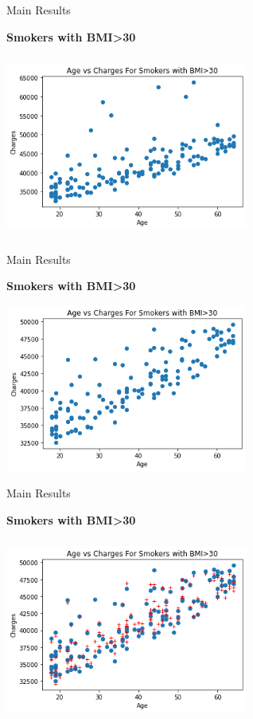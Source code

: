\documentclass[handout,9pt]{beamer}
\numberwithin{theorem}{section}
\begin{document}
\begin{frame}{Main Results}
	\begin{spacing}{1}
		\textbf{Smokers with BMI>30}
		\begin{center}
			\includegraphics[height=6cm, width=8cm]{work7}
		\end{center}
	\end{spacing}
\end{frame}

\begin{frame}{Main Results}
	\begin{spacing}{1}
		\textbf{Smokers with BMI>30}
		\begin{center}
			\includegraphics[height=5.5cm, width=8cm]{work8}
		\end{center}
	\hspace{3.5cm}{Correlation between Age and Charges = 0.8623745}
	\end{spacing}
\end{frame}

\begin{frame}{Main Results}
	\begin{spacing}{1}
		\textbf{Smokers with BMI>30}
		\begin{center}
			\includegraphics[height=6cm, width=8cm]{work10}
		\end{center}
	\end{spacing}
\end{frame}
\end{document}
